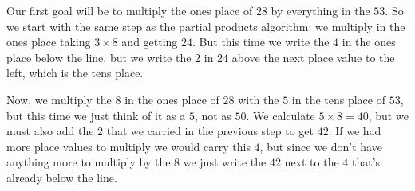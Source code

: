 \documentclass{ximera}
\begin{document}
Our first goal will be to multiply the ones place of $28$ by everything in the $53$. So we start with the same step as the partial products algorithm: we multiply in the ones place taking $3 \times 8$ and getting $24$. But this time we write the $4$ in the ones place below the line, but we write the $2$ in $24$ above the next place value to the left, which is the tens place.
\begin{center}
\end{center}

Now, we multiply the $8$ in the ones place of $28$ with the $5$ in the tens place of $53$, but this time we just think of it as a $5$, not as $50$. We calculate $5 \times 8 = 40$, but we must also add the $2$ that we carried in the previous step to get $42$. If we had more place values to multiply we would carry this $4$, but since we don't have anything more to multiply by the $8$ we just write the $42$ next to the $4$ that's already below the line.

\begin{center}
\end{center}
\end{document}
